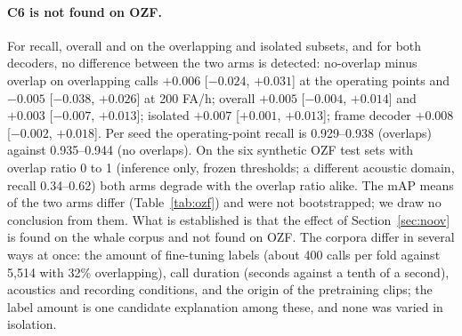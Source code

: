 \documentclass[10pt,twocolumn]{article}
\begin{document}
\begin{table}[t]
\centering\footnotesize
\caption{OZF test split (13 recordings, 1{,}744 references, 548 overlapping). Operating point: validation-chosen thresholds for 400 FA per slowed hour; FAR in false alarms per slowed hour (halve for real time). R@200 and overlap R@200: pooled curve at a global FAR of 200. mAP in Voxaboxen's definition, real time, same split and boxes; Voxaboxen's published OZF numbers with its own pipeline are 97.92 / 81.23. Our models: three seeds pooled; Voxaboxen: one model.}
\label{tab:ozf}
\setlength{\tabcolsep}{5pt}
\end{table}

\paragraph{C6 is not found on OZF.} For recall, overall and on the overlapping and isolated subsets, and for both decoders, no difference between the two arms is detected: no-overlap minus overlap on overlapping calls $+0.006$ [$-0.024$, $+0.031$] at the operating points and $-0.005$ [$-0.038$, $+0.026$] at 200 FA/h; overall $+0.005$ [$-0.004$, $+0.014$] and $+0.003$ [$-0.007$, $+0.013$]; isolated $+0.007$ [$+0.001$, $+0.013$]; frame decoder $+0.008$ [$-0.002$, $+0.018$]. Per seed the operating-point recall is 0.929--0.938 (overlaps) against 0.935--0.944 (no overlaps). On the six synthetic OZF test sets with overlap ratio 0 to 1 (inference only, frozen thresholds; a different acoustic domain, recall 0.34--0.62) both arms degrade with the overlap ratio alike. The mAP means of the two arms differ (Table~\ref{tab:ozf}) and were not bootstrapped; we draw no conclusion from them. What is established is that the effect of Section~\ref{sec:noov} is found on the whale corpus and not found on OZF. The corpora differ in several ways at once: the amount of fine-tuning labels (about 400 calls per fold against 5{,}514 with 32\% overlapping), call duration (seconds against a tenth of a second), acoustics and recording conditions, and the origin of the pretraining clips; the label amount is one candidate explanation among these, and none was varied in isolation.
\end{document}
